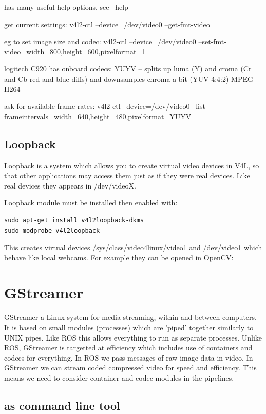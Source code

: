 \documentclass[oneside,english]{scrbook}
\begin{document}
has many useful help options, see --help 

get current settings: v4l2-ctl --device=/dev/video0 --get-fmt-video

eg to set image size and codec: v4l2-ctl --device=/dev/video0 --set-fmt-video=width=800,height=600,pixelformat=1

logitech C920 has onboard codecs: YUYV -- splits up luma (Y) and croma
(Cr and Cb red and blue diffs) and downsamples chroma a bit (YUV 4:4:2)
MPEG H264

ask for available frame rates: v4l2-ctl --device=/dev/video0 --list-frameintervals=width=640,height=480,pixelformat=YUYV


\section{Loopback}
\label{loopback}

Loopback is a system which allows you to create virtual video devices
in V4L, so that other applications may access them just as if they
were real devices. Like real devices they appears in /dev/videoX.

Loopback module must be installed then enabled with:

\begin{lstlisting}
sudo apt-get install v4l2loopback-dkms 
sudo modprobe v4l2loopback
\end{lstlisting}
This creates virtual devices /sys/class/video4linux/video1 and /dev/video1 which behave like local webcams. For example they can be opened in OpenCV:




\chapter{GStreamer}

GStreamer a Linux system for media streaming, within and between computers. It is based on small modules (processes) which are 'piped' together similarly to UNIX pipes.  Like ROS this allows everything to run as separate processes. Unlike ROS, GStreamer is targetted at efficiency which includes use of containers and codecs for everything. In ROS we pass messages of raw image data in video. In GStreamer we can stream coded compressed video for speed and efficiency.  This means we need to consider container and codec modules in the pipelines.

\section{as command line tool}
\end{document}
